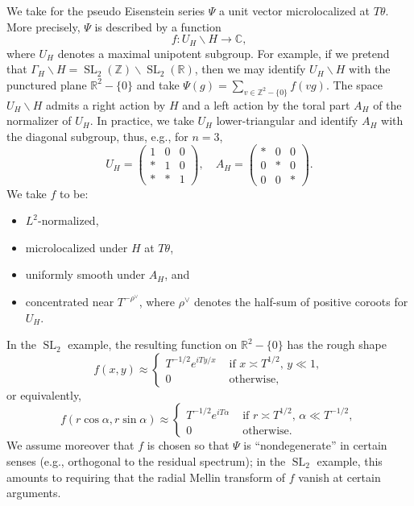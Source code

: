 \documentclass[reqno]{amsart}
\DeclareMathOperator{\SL}{SL}
\theoremstyle{plain} \newtheorem{theorem} {Theorem}
\theoremstyle{definition} \newtheorem{definition} [theorem] {Definition}
\theoremstyle{itplain} %
\numberwithin{equation}{section}
\numberwithin{theorem}{section}
\begin{document}
We take for the pseudo Eisenstein series $\Psi$ a unit vector microlocalized at $T \theta$.  More precisely, $\Psi$ is described by a function
\begin{equation*}
  f : U_H \backslash H \rightarrow \mathbb{C},
\end{equation*}
where $U_H$ denotes a maximal unipotent subgroup.  For example, if we pretend that $\Gamma_H \backslash H = \SL_2(\mathbb{Z}) \backslash \SL_2(\mathbb{R})$, then we may identify $U_H \backslash H$ with the punctured plane $\mathbb{R}^2 - \{0\}$ and take $\Psi(g) = \sum _{v \in \mathbb{Z}^2 - \{0\}} f(v g)$.  The space $U_H \backslash H$ admits a right action by $H$ and a left action by the toral part $A_H$ of the normalizer of $U_H$.  In practice, we take $U_H$ lower-triangular and identify $A_H$ with the diagonal subgroup, thus, e.g., for $n=3$,
\begin{equation*}
  U_H = \begin{pmatrix}
    1 & 0 & 0 \\
    \ast & 1 & 0 \\
    \ast & \ast & 1
  \end{pmatrix},
  \quad
  A_H = \begin{pmatrix}
    \ast& 0 & 0 \\
    0 & \ast & 0 \\
    0 & 0 & \ast
  \end{pmatrix}.
\end{equation*}
We take $f$ to be:
\begin{itemize}
\item $L^2$-normalized,
\item microlocalized under $H$ at $T \theta$,
\item uniformly smooth under $A_H$, and
\item concentrated near $T^{-\rho^\vee}$, where $\rho^\vee$ denotes the half-sum of positive coroots for $U_H$.
\end{itemize}
In the $\SL_2$ example, the resulting function on $\mathbb{R}^2 - \{0\}$ has the rough shape
\begin{equation*}
  f(x,y) \approx
  \begin{cases}
    T^{-1/2}
      e^{i T y/x}
      & \text{ if }
      x \asymp T^{1/2}, \, y \ll 1, \\
      0 & \text{ otherwise,}
  \end{cases}
\end{equation*}
or equivalently,
\begin{equation*}
  f(r \cos \alpha, r \sin \alpha) \approx
  \begin{cases}
  T^{-1/2}  e^{i T \alpha}
     & \text{ if } r \asymp T^{1/2}, \,  \alpha \ll T^{-1/2}, \\
     0 & \text{ otherwise.}
  \end{cases}
\end{equation*}
We assume moreover that $f$ is chosen so that $\Psi$ is ``nondegenerate'' in certain senses (e.g., orthogonal to the residual spectrum); in the $\SL_2$ example, this amounts to requiring that the radial Mellin transform of $f$ vanish at certain arguments.
\end{document}
